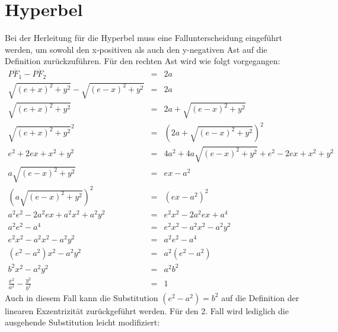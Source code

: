 \section{Hyperbel}
Bei der Herleitung für die Hyperbel muss eine Fallunterscheidung eingeführt werden, um sowohl den x-positiven als auch den y-negativen Ast auf die Definition zurückzuführen. Für den rechten Ast wird wie folgt vorgegangen:
\begin{displaymath}
	\begin{array}{rcl}
		\overline{{PF}_1} - \overline{{PF}_2}  & = & 2a\\
		\sqrt{{(e+x)}^2 + y^2} - \sqrt{{(e-x)}^2 + y^2} & = & 2a\\
		\sqrt{{(e+x)}^2 + y^2} & = & 2a + \sqrt{{(e-x)}^2 + y^2}\\
		\sqrt{{(e+x)}^2 + y^2}^2 & = & \left (2a + \sqrt{{(e-x)}^2 + y^2}\right )^2\\
		e^2 + 2ex + x^2 + y^2 & = & 4a^2 + 4a \sqrt{(e-x)^2+y^2} + e^2 - 2ex + x^2 + y^2\\
		a\sqrt{{(e-x)}^2 + y^2} & = & ex - a^2\\
		\left (a\sqrt{{(e-x)}^2 + y^2}\right )^2 & = & (ex - a^2)^2\\
		a^2e^2 - 2a^2ex + a^2x^2 + a^2y^2 &=& e^2x^2 - 2a^2ex + a^4\\
		a^2e^2 - a^4 &=& e^2x^2 - a^2x^2 - a^2y^2\\
		e^2x^2 - a^2x^2 - a^2y^2 &=& a^2e^2 - a^4\\
		\left(e^2 - a^2\right)x^2 - a^2y^2 &=& a^2\left(e^2 - a^2\right)\\
		b^2x^2 - a^2y^2 &=& a^2b^2\\
		\frac{x^2}{a^2} - \frac{y^2}{b^2} &=& 1
	\end{array}
\end{displaymath}
Auch in diesem Fall kann die Substitution $\left(e^2 - a^2\right) = b^2$ auf die Definition der linearen Exzentrizität zurückgeführt werden. Für den 2. Fall wird lediglich die ausgehende Substitution leicht modifiziert:
